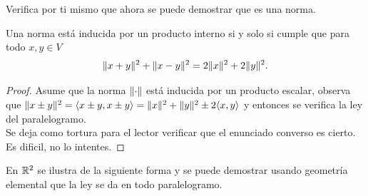 Verifica por ti mismo que ahora se puede demostrar que es una norma.
\begin{proposition}
  Una norma está inducida por un producto interno si y solo si cumple que para todo $x,y\in V$ \[
    \lVert x+y\rVert^2+\lVert x-y\rVert^2=2\lVert x\rVert^2+2\lVert y\rVert^2.
  \] 
\end{proposition}
\begin{proof}
  Asume que la norma $\lVert\cdot\rVert$ está inducida por un producto escalar, observa que $\lVert x\pm y\rVert^2=\langle x\pm y,x\pm y\rangle=\lVert x\rVert^2+\lVert y\rVert^2\pm 2\langle x,y\rangle$ y entonces se verifica la ley del paralelogramo.\\
  Se deja como tortura para el lector verificar que el enunciado converso es cierto. Es dificil, no lo intentes.
\end{proof}
En $\mathbb{R}^2$ se ilustra de la siguiente forma y se puede demostrar usando geometría elemental que la ley se da en todo paralelogramo. 

